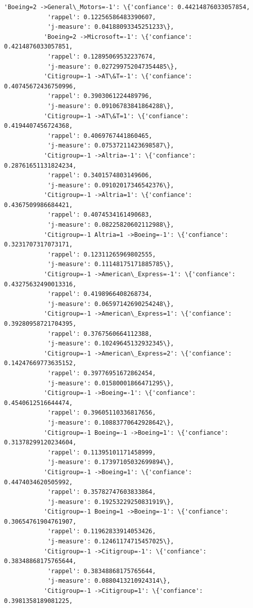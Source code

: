 \documentclass[11pt]{article}
\begin{document}
\begin{Verbatim}[commandchars=\\\{\}]
           'Boeing=2 ->General\_Motors=-1': \{'confiance': 0.44214876033057854,
            'rappel': 0.12256586483390607,
            'j-measure': 0.04188093345251233\},
           'Boeing=2 ->Microsoft=-1': \{'confiance': 0.4214876033057851,
            'rappel': 0.12895069532237674,
            'j-measure': 0.027299752047354485\},
           'Citigroup=-1 ->AT\&T=-1': \{'confiance': 0.40745672436750996,
            'rappel': 0.3903061224489796,
            'j-measure': 0.09106783841864288\},
           'Citigroup=-1 ->AT\&T=1': \{'confiance': 0.4194407456724368,
            'rappel': 0.4069767441860465,
            'j-measure': 0.07537211423698587\},
           'Citigroup=-1 ->Altria=-1': \{'confiance': 0.28761651131824234,
            'rappel': 0.3401574803149606,
            'j-measure': 0.09102017346542376\},
           'Citigroup=-1 ->Altria=1': \{'confiance': 0.4367509986684421,
            'rappel': 0.4074534161490683,
            'j-measure': 0.08225820602112988\},
           'Citigroup=-1 Altria=1 ->Boeing=-1': \{'confiance': 0.3231707317073171,
            'rappel': 0.12311265969802555,
            'j-measure': 0.11148175171885785\},
           'Citigroup=-1 ->American\_Express=-1': \{'confiance': 0.43275632490013316,
            'rappel': 0.4198966408268734,
            'j-measure': 0.06597142690254248\},
           'Citigroup=-1 ->American\_Express=1': \{'confiance': 0.39280958721704395,
            'rappel': 0.3767560664112388,
            'j-measure': 0.10249645132932345\},
           'Citigroup=-1 ->American\_Express=2': \{'confiance': 0.14247669773635152,
            'rappel': 0.39776951672862454,
            'j-measure': 0.01580001866471295\},
           'Citigroup=-1 ->Boeing=-1': \{'confiance': 0.4540612516644474,
            'rappel': 0.39605110336817656,
            'j-measure': 0.10883770642928642\},
           'Citigroup=-1 Boeing=-1 ->Boeing=1': \{'confiance': 0.31378299120234604,
            'rappel': 0.11395101171458999,
            'j-measure': 0.17397105032699894\},
           'Citigroup=-1 ->Boeing=1': \{'confiance': 0.4474034620505992,
            'rappel': 0.35782747603833864,
            'j-measure': 0.19253229250831919\},
           'Citigroup=-1 Boeing=1 ->Boeing=-1': \{'confiance': 0.30654761904761907,
            'rappel': 0.11962833914053426,
            'j-measure': 0.12461174715457025\},
           'Citigroup=-1 ->Citigroup=-1': \{'confiance': 0.38348868175765644,
            'rappel': 0.38348868175765644,
            'j-measure': 0.0880413210924314\},
           'Citigroup=-1 ->Citigroup=1': \{'confiance': 0.3981358189081225,

\end{Verbatim}
\end{document}
